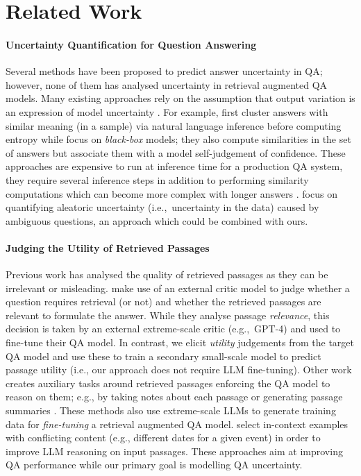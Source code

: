 \section{Related Work}
\paragraph{Uncertainty Quantification for Question Answering}
 Several methods have been proposed to predict answer uncertainty in
 QA; however, none of them has analysed uncertainty in retrieval
 augmented QA models.  Many existing approaches rely on the assumption
 that output variation is an expression of model uncertainty
 \citep{kuhn2023semantic,farquhar2024semantic-hallu,chen-mueller-2024-quantifying}. For
 example, \citet{kuhn2023semantic} first cluster answers with similar
 meaning (in a sample) via natural language inference before computing
 entropy while \citet{chen-mueller-2024-quantifying} focus on
 \emph{black-box} models; they also compute similarities in the set of
 answers but associate them with a model self-judgement of
 confidence. These approaches are expensive to run at inference time
 for a production QA system, they require several inference steps in
 addition to performing similarity computations which can become more
 complex with longer answers \citep{zhang-etal-2024-fine}.
 \citet{hou2024decomposing} focus on quantifying aleatoric uncertainty
 (i.e.,~uncertainty in the data) caused by ambiguous questions, an
 approach which could be combined with ours.


\paragraph{Judging the Utility of Retrieved Passages}

Previous work has analysed the quality of retrieved passages
\citep{yu2023CoN,asai2024selfrag,wang2024rear,xu2024recomp,yoran2024making}
as they can be irrelevant or misleading.  \citet{asai2024selfrag} make
use of an external critic model to judge whether a question requires
retrieval (or not) and whether the retrieved passages are relevant to
formulate the answer.  While they analyse passage \emph{relevance},
this decision is taken by an external extreme-scale critic
(e.g.,~GPT-4) and used to fine-tune their QA model. In contrast, we
elicit \emph{utility} judgements from the target QA model and use
these to train a secondary small-scale model to predict passage
utility (i.e., our approach does not require LLM fine-tuning). Other
work creates auxiliary tasks around retrieved passages enforcing the
QA model to reason on them; e.g., by taking notes about each passage
\citep{yu2023CoN} or generating passage summaries
\citep{xu2024recomp}. These methods also use extreme-scale LLMs to
generate training data for \emph{fine-tuning} a retrieval augmented QA
model. \citet{park-etal-2024-enhancing} select in-context examples
with conflicting content (e.g., different dates for a given event) in
order to improve LLM reasoning on input passages.  These approaches
aim at improving QA performance while our primary goal is modelling QA
uncertainty.

